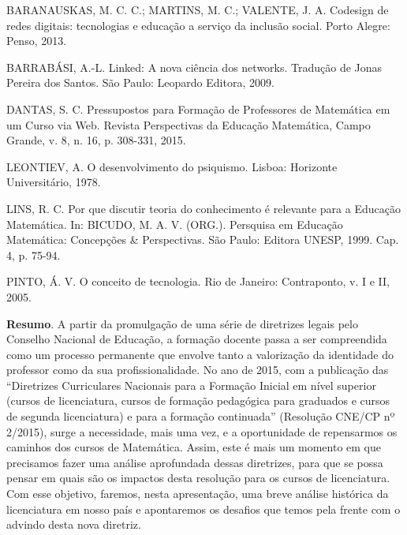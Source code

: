 	
	\begin{thebibliography}{999}
	\bibitem{} BARANAUSKAS, M. C. C.; MARTINS, M. C.; VALENTE, J. A. Codesign de redes digitais: tecnologias e educação a serviço da inclusão social. Porto Alegre: Penso, 2013. 
	
	\bibitem{} BARRABÁSI, A.-L. Linked: A nova ciência dos networks. Tradução de Jonas Pereira dos Santos. São Paulo: Leopardo Editora, 2009.
	
	\bibitem{} DANTAS, S. C. Pressupostos para Formação de Professores de Matemática em um Curso via Web. Revista Perspectivas da Educação Matemática, Campo Grande, v. 8, n. 16, p. 308-331, 2015.
	
	\bibitem{} LEONTIEV, A. O desenvolvimento do psiquismo. Lisboa: Horizonte Universitário, 1978.
	
	\bibitem{} LINS, R. C. Por que discutir teoria do conhecimento é relevante para a Educação Matemática. In: BICUDO, M. A. V. (ORG.). Persquisa em Educação Matemática: Concepções \& Perspectivas. São Paulo: Editora UNESP, 1999. Cap. 4, p. 75-94.
	
	\bibitem{} PINTO, Á. V. O conceito de tecnologia. Rio de Janeiro: Contraponto, v. I e II, 2005.
	\end{thebibliography}

\vspace{24pt}

	
	
	\noindent\textbf{Resumo}.\label{wlc} 
	A partir da promulgação de uma série de diretrizes legais pelo Conselho Nacional de Educação, a formação docente passa a ser compreendida como um processo permanente que envolve tanto a valorização da identidade do professor como da sua profissionalidade. No ano de 2015, com a publicação das “Diretrizes Curriculares Nacionais para a Formação Inicial em nível superior (cursos de licenciatura, cursos de formação pedagógica para graduados e cursos de segunda licenciatura) e para a formação continuada” (Resolução CNE/CP nº 2/2015), surge a necessidade, mais uma vez, e a oportunidade de repensarmos os caminhos dos cursos de Matemática. Assim, este é mais um momento em que precisamos fazer uma análise aprofundada dessas diretrizes, para que se possa pensar em quais são os impactos desta resolução para os cursos de licenciatura. Com esse objetivo, faremos, nesta apresentação, uma breve análise histórica da licenciatura em nosso país e apontaremos os desafios que temos pela frente com o advindo desta nova diretriz.
	
